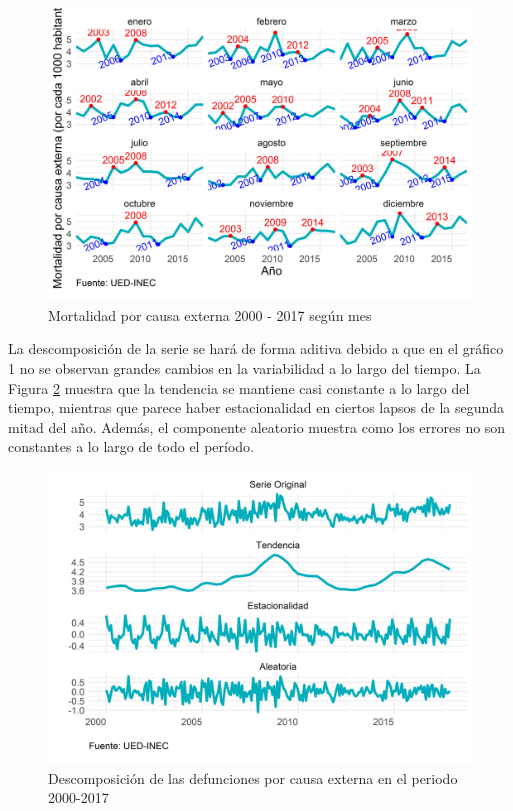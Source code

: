 \documentclass[
]{article}
\begin{document}
\begin{figure}[H]
\includegraphics[width=1\linewidth,height=1\textheight]{Tesis_files/figure-latex/externasplotperiodos-1} \caption{Mortalidad por causa externa 2000 - 2017 según mes}\label{fig:externasplotperiodos}
\end{figure}

La descomposición de la serie se hará de forma aditiva debido a que en
el gráfico 1 no se observan grandes cambios en la variabilidad a lo
largo del tiempo. La Figura \ref{fig:externasplotdescomposicion} muestra
que la tendencia se mantiene casi constante a lo largo del tiempo,
mientras que parece haber estacionalidad en ciertos lapsos de la segunda
mitad del año. Además, el componente aleatorio muestra como los errores
no son constantes a lo largo de todo el período.

\begin{figure}[H]
\includegraphics[width=1\linewidth,height=1\textheight]{Tesis_files/figure-latex/externasplotdescomposicion-1} \caption{Descomposición de las defunciones por causa externa en el periodo 2000-2017}\label{fig:externasplotdescomposicion}
\end{figure}
\end{document}
